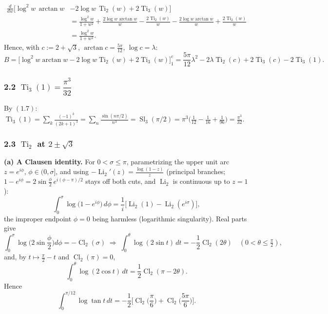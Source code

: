 \documentclass[11pt]{article}
\theoremstyle{remark}
\begin{document}
\[
\begin{aligned}
\frac{d}{dw}\Big[\log^2 w\,\arctan w&-2\log w\,\operatorname{Ti}_2(w)+2\operatorname{Ti}_3(w)\Big]\\
&=\frac{\log^2w}{1+w^2}+\frac{2\log w\arctan w}{w}-\frac{2\operatorname{Ti}_2(w)}{w}-\frac{2\log w\arctan w}{w}+\frac{2\operatorname{Ti}_2(w)}{w}\\
&=\frac{\log^2w}{1+w^2}.
\end{aligned}
\]
Hence, with $c:=2+\sqrt3$, $\arctan c=\frac{5\pi}{12}$, $\log c=\lambda$:
\begin{equation*}
B=\Big[\log^2w\arctan w-2\log w\operatorname{Ti}_2(w)+2\operatorname{Ti}_3(w)\Big]_1^{c}
=\frac{5\pi}{12}\lambda^2-2\lambda\operatorname{Ti}_2(c)+2\operatorname{Ti}_3(c)-2\operatorname{Ti}_3(1). \tag{2.1}
\end{equation*}

\subsubsection*{2.2 $\operatorname{Ti}_3(1)=\dfrac{\pi^3}{32}$}

By $(1.7)$: $\operatorname{Ti}_3(1)=\sum_k\frac{(-1)^k}{(2k+1)^3}=\sum_n\frac{\sin(n\pi/2)}{n^3}=\operatorname{Sl}_3(\pi/2)=\pi^3\big(\frac1{12}-\frac1{16}+\frac1{96}\big)=\frac{\pi^3}{32}$.

\subsubsection*{2.3 $\operatorname{Ti}_2$ at $2\pm\sqrt3$}

\textbf{(a) A Clausen identity.} For $0<\sigma\le\pi$, parametrizing the upper unit arc $z=e^{i\phi}$, $\phi\in(0,\sigma]$, and using $-\operatorname{Li}_2'(z)=\frac{\log(1-z)}{z}$ (principal branches; $1-e^{i\phi}=2\sin\frac\phi2\,e^{i(\phi-\pi)/2}$ stays off both cuts, and $\operatorname{Li}_2$ is continuous up to $z=1$):
\[
\int_0^\sigma\log\big(1-e^{i\phi}\big)\,d\phi=\frac1i\Big[\operatorname{Li}_2(1)-\operatorname{Li}_2(e^{i\sigma})\Big],
\]
the improper endpoint $\phi=0$ being harmless (logarithmic singularity). Real parts give
\[
\int_0^\sigma\log\Big(2\sin\frac\phi2\Big)d\phi=-\operatorname{Cl}_2(\sigma)
\;\Longrightarrow\;
\int_0^\theta\log(2\sin t)\,dt=-\frac12\operatorname{Cl}_2(2\theta)\quad(0<\theta\le\tfrac\pi2),
\]
and, by $t\mapsto\frac\pi2-t$ and $\operatorname{Cl}_2(\pi)=0$,
\[
\int_0^\theta\log(2\cos t)\,dt=\frac12\operatorname{Cl}_2(\pi-2\theta).
\]
Hence
\begin{equation*}
\int_0^{\pi/12}\log\tan t\,dt=-\frac12\Big[\operatorname{Cl}_2\!\Big(\frac{\pi}{6}\Big)+\operatorname{Cl}_2\!\Big(\frac{5\pi}{6}\Big)\Big]. \tag{2.2}
\end{equation*}
\end{document}
